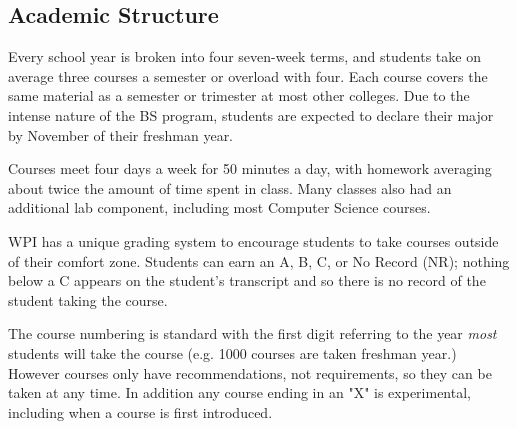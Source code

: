 \subsection*{Academic Structure}
Every school year is broken into four seven-week terms, and students
take on average three courses a semester or overload with four. Each
course covers the same material as a semester or trimester at most other
colleges. Due to the intense nature of the BS program, students are
expected to declare their major by November of their freshman year.

Courses meet four days a week for 50 minutes a day, with homework
averaging about twice the amount of time spent in class. Many classes
also had an additional lab component, including most Computer Science
courses.

WPI has a unique grading system to encourage students to take courses
outside of their comfort zone. Students can earn an A, B, C, or No
Record (NR); nothing below a C appears on the student's transcript and
so there is no record of the student taking the course.

The course numbering is standard with the first digit referring to the
year \emph{most} students will take the course (e.g. 1000 courses are
taken freshman year.) However courses only have recommendations, not
requirements, so they can be taken at any time. In addition any course
ending in an "X" is experimental, including when a course is first
introduced.
